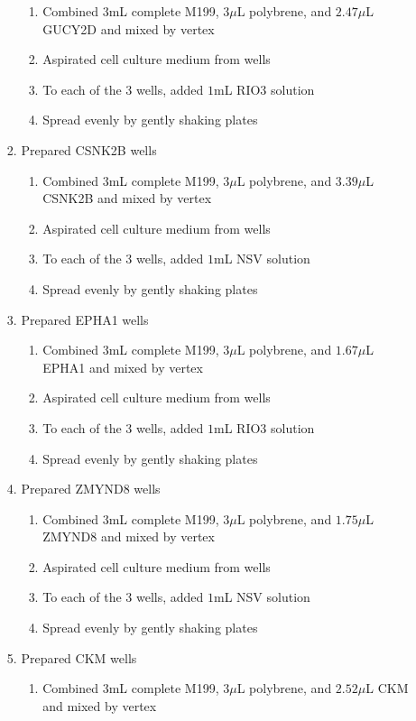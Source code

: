 \begin{enumerate}
\begin{enumerate}
\begin{enumerate}
\begin{enumerate}
							\item Combined $3$mL complete M199, $3\mu$L polybrene, and $2.47\mu$L GUCY2D and mixed by vertex
							\item Aspirated cell culture medium from wells
							\item To each of the 3 wells, added $1$mL RIO3 solution
							\item Spread evenly by gently shaking plates
						\end{enumerate}
					\item Prepared CSNK2B wells
						\begin{enumerate}
							\item Combined $3$mL complete M199, $3\mu$L polybrene, and $3.39\mu$L CSNK2B and mixed by vertex
							\item Aspirated cell culture medium from wells
							\item To each of the 3 wells, added $1$mL NSV solution
							\item Spread evenly by gently shaking plates
						\end{enumerate}
					\item Prepared EPHA1 wells
						\begin{enumerate}
							\item Combined $3$mL complete M199, $3\mu$L polybrene, and $1.67\mu$L EPHA1 and mixed by vertex
							\item Aspirated cell culture medium from wells
							\item To each of the 3 wells, added $1$mL RIO3 solution
							\item Spread evenly by gently shaking plates
						\end{enumerate}
					\item Prepared ZMYND8 wells
						\begin{enumerate}
							\item Combined $3$mL complete M199, $3\mu$L polybrene, and $1.75\mu$L ZMYND8 and mixed by vertex
							\item Aspirated cell culture medium from wells
							\item To each of the 3 wells, added $1$mL NSV solution
							\item Spread evenly by gently shaking plates
						\end{enumerate}
					\item Prepared CKM wells
						\begin{enumerate}
							\item Combined $3$mL complete M199, $3\mu$L polybrene, and $2.52\mu$L CKM and mixed by vertex

\end{enumerate}
\end{enumerate}
\end{enumerate}
\end{enumerate}
